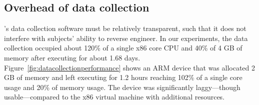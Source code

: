 
\subsection{Overhead of data collection}

\revenge's data collection software must be relatively transparent, such that it does not interfere with subjects' ability to reverse engineer.  In our experiments, the data collection occupied about 120\% of a single x86 core CPU and 40\% of 4 GB of memory after executing for about 1.68 days. Figure~\ref{fig:datacollectionperformance} shows an ARM device that was allocated 2 GB of memory and left executing for 1.2 hours reaching 102\% of a single core usage and 20\% of memory usage. The device was significantly laggy---though usable---compared to the x86 virtual machine with additional resources.



